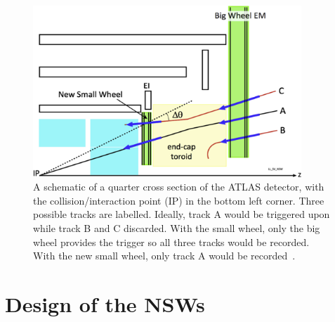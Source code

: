 \begin{figure}
    \centering
    \includegraphics[width = 0.9\textwidth]{figures/perez-codina_NSW_tracks.jpg}
    \caption{A schematic of a quarter cross section of the ATLAS detector, with the collision/interaction point (IP) in the bottom left corner. Three possible tracks are labelled. Ideally, track A would be triggered upon while track B and C discarded. With the small wheel, only the big wheel provides the trigger so all three tracks would be recorded. With the new small wheel, only track A would be recorded~\cite{nsw_tdr}.}
    \label{fig:nsw_track_triggering}
\end{figure}

\section{Design of the NSWs}

